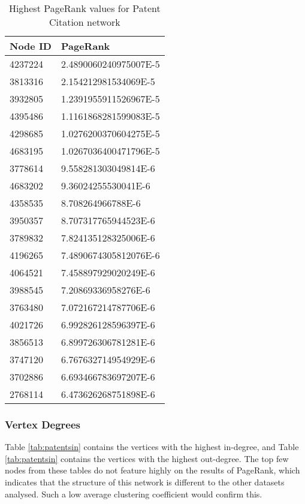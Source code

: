 \begin{table}[htbp]%
\centering
\begin{tabular}{|l|l|}
\hline
Node ID & PageRank \\
\hline
4237224 & 2.4890060240975007E-5 \\
3813316 & 2.154212981534069E-5 \\
3932805 & 1.2391955911526967E-5 \\
4395486 & 1.1161868281599083E-5 \\
4298685 & 1.0276200370604275E-5 \\
4683195 & 1.0267036400471796E-5 \\
3778614 & 9.558281303049814E-6 \\
4683202 & 9.36024255530041E-6 \\
4358535 & 8.708264966788E-6 \\
3950357 & 8.707317765944523E-6 \\
3789832 & 7.824135128325006E-6 \\
4196265 & 7.4890674305812076E-6 \\
4064521 & 7.458897929020249E-6 \\
3988545 & 7.20869336958276E-6 \\
3763480 & 7.072167214787706E-6 \\
4021726 & 6.992826128596397E-6 \\
3856513 & 6.899726306781281E-6 \\
3747120 & 6.767632714954929E-6 \\
3702886 & 6.693466783697207E-6 \\
2768114 & 6.473626268751898E-6 \\
\hline
\end{tabular}
\caption{Highest PageRank values for Patent Citation network}
\label{tab:patentspr}
\end{table}

\subsubsection{Vertex Degrees}
Table \ref{tab:patentsin} contains the vertices with the highest in-degree, and Table \ref{tab:patentsin} contains the vertices with the highest out-degree. The top few nodes from these tables do not feature highly on the results of PageRank, which indicates that the structure of this network is different to the other datasets analysed. Such a low average clustering coefficient would confirm this.

